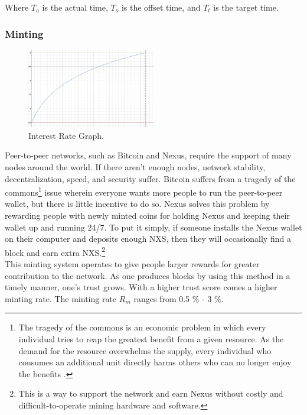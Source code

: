 \documentclass[11pt]{article}
\begin{document}
\begin{center}
Where $T_a$ is the actual time, $T_o$ is the offset time, and $T_t$ is the target time.\\
\end{center}


\subsubsection{Minting}

\begin{figure}\label{fig:interestrate} %
    \centering
    \includegraphics[width=0.50\textwidth]{interest.png}
    \caption{Interest Rate Graph.}
\end{figure}

Peer-to-peer networks, such as Bitcoin and Nexus, require the support of many nodes around the world.
If there aren't enough nodes, network stability, decentralization, speed, and security suffer.
Bitcoin suffers from a tragedy of the commons\footnote{The tragedy of the commons is an economic problem in which every individual tries to reap the greatest benefit from a given resource. As the demand for the resource overwhelms the supply, every individual who consumes an additional unit directly harms others who can no longer enjoy the benefits \cite{tragedycommons}.}
\noindent issue wherein everyone wants more people to run the peer-to-peer wallet, but there is little incentive to do so.
Nexus solves this problem by rewarding people with newly minted coins for holding Nexus and keeping their wallet up and running 24/7.
To put it simply, if someone installs the Nexus wallet on their computer and deposits enough NXS, then they will occasionally find a block and earn extra NXS.\footnote{This is a way to support the network and earn Nexus without costly and difficult-to-operate mining hardware and software.}\\

\noindent This minting system operates to give people larger rewards for greater contribution to the network. 
As one produces blocks by using this method in a timely manner, one's trust grows.
With a higher trust score comes a higher minting rate.
The minting rate $R_m$ ranges from 0.5 \% - 3 \%.
\end{document}
